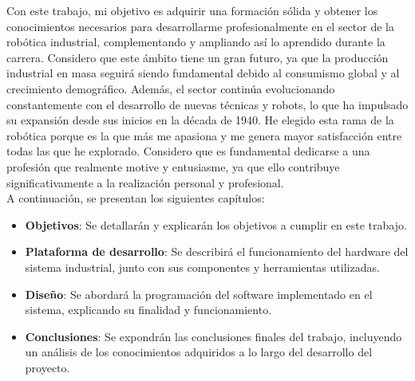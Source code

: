 Con este trabajo, mi objetivo es adquirir una formación sólida y obtener los conocimientos necesarios para desarrollarme profesionalmente en el sector de la robótica industrial, complementando y ampliando así lo aprendido durante la carrera. Considero que este ámbito tiene un gran futuro, ya que la producción industrial en masa seguirá siendo fundamental debido al consumismo global y al crecimiento demográfico. Además, el sector continúa evolucionando constantemente con el desarrollo de nuevas técnicas y robots, lo que ha impulsado su expansión desde sus inicios en la década de 1940. He elegido esta rama de la robótica porque es la que más me apasiona y me genera mayor satisfacción entre todas las que he explorado. Considero que es fundamental dedicarse a una profesión que realmente motive y entusiasme, ya que ello contribuye significativamente a la realización personal y profesional. \\

A continuación, se presentan los siguientes capítulos:

\begin{itemize}
    \item \textbf{Objetivos}: Se detallarán y explicarán los objetivos a cumplir en este trabajo.
    \item \textbf{Plataforma de desarrollo}: Se describirá el funcionamiento del hardware del sistema industrial, junto con sus componentes y herramientas utilizadas.
    \item \textbf{Diseño}: Se abordará la programación del software implementado en el sistema, explicando su finalidad y funcionamiento.
    \item \textbf{Conclusiones}: Se expondrán las conclusiones finales del trabajo, incluyendo un análisis de los conocimientos adquiridos a lo largo del desarrollo del proyecto.
\end{itemize}
